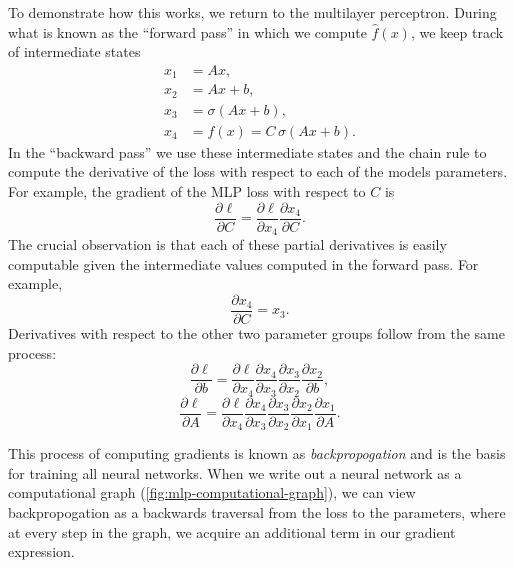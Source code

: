 To demonstrate how this works, we return to the multilayer perceptron. During what is known as the ``forward pass'' in which we compute $\hat f(x)$, we keep track of intermediate states
\begin{equation}
	\begin{aligned}
		x_1 & = Ax,                          \\
		x_2 & = Ax  + b,                     \\
		x_3 & = \sigma(Ax  + b),             \\
		x_4 & = f(x) = C \, \sigma(Ax  + b).
	\end{aligned}
\end{equation}
In the ``backward pass'' we use these intermediate states and the chain rule to compute the derivative of the loss with respect to each of the models parameters.
For example, the gradient of the MLP loss with respect to $C$ is
\begin{equation*}
	\frac{\partial \ell}{\partial C}
	= \frac{\partial \ell}{\partial x_4}
	\frac{\partial x_4}{\partial C}.
\end{equation*}
The crucial observation is that each of these partial derivatives is easily computable given the intermediate values computed in the forward pass. For example,
\begin{equation}
	\frac{\partial x_4}{\partial C} = x_3.
\end{equation}
Derivatives with respect to the other two parameter groups follow from the same process:
\begin{equation*}
	\frac{\partial \ell}{\partial b}
	= \frac{\partial \ell}{\partial x_4}
	\frac{\partial x_4}{\partial x_3}
	\frac{\partial x_3}{\partial x_2}
	\frac{\partial x_2}{\partial b},
\end{equation*}
\begin{equation*}
	\frac{\partial \ell}{\partial A}
	= \frac{\partial \ell}{\partial x_4}
	\frac{\partial x_4}{\partial x_3}
	\frac{\partial x_3}{\partial x_2}
	\frac{\partial x_2}{\partial x_1}
	\frac{\partial x_1}{\partial A}.
\end{equation*}


This process of computing gradients is known as \emph{backpropogation} and is the basis for training all neural networks. When we write out a neural network as a computational graph (\autoref{fig:mlp-computational-graph}), we can view backpropogation as a backwards traversal from the loss to the parameters, where at every step in the graph, we acquire an additional term in our gradient expression.

